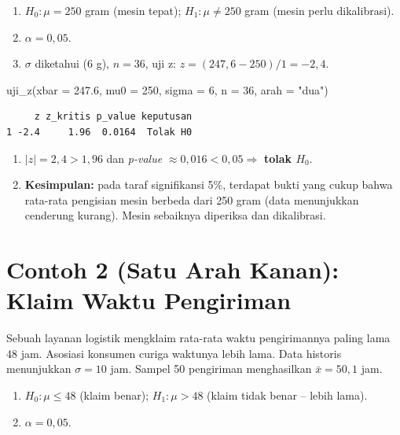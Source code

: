 \documentclass[
  indonesian,
  letterpaper,
]{book}
\newenvironment{Shaded}{\begin{snugshade}}{\end{snugshade}}
\newcommand{\AttributeTok}[1]{\textcolor[rgb]{0.40,0.45,0.13}{#1}}
\newcommand{\DecValTok}[1]{\textcolor[rgb]{0.68,0.00,0.00}{#1}}
\newcommand{\FloatTok}[1]{\textcolor[rgb]{0.68,0.00,0.00}{#1}}
\newcommand{\FunctionTok}[1]{\textcolor[rgb]{0.28,0.35,0.67}{#1}}
\newcommand{\NormalTok}[1]{\textcolor[rgb]{0.00,0.23,0.31}{#1}}
\newcommand{\StringTok}[1]{\textcolor[rgb]{0.13,0.47,0.30}{#1}}
\providecommand{\tightlist}{%
  \setlength{\itemsep}{0pt}\setlength{\parskip}{0pt}}
\begin{document}
\begin{enumerate}
\def\labelenumi{\arabic{enumi}.}
\tightlist
\item
  \(H_0: \mu = 250\) gram (mesin tepat); \(H_1: \mu \ne 250\) gram
  (mesin perlu dikalibrasi).
\item
  \(\alpha = 0{,}05\).
\item
  \(\sigma\) diketahui (6 g), \(n = 36\), uji z:
  \(z = (247{,}6 - 250)/1 = -2{,}4\).
\end{enumerate}

\begin{Shaded}
\begin{Highlighting}[]
\FunctionTok{uji\_z}\NormalTok{(}\AttributeTok{xbar =} \FloatTok{247.6}\NormalTok{, }\AttributeTok{mu0 =} \DecValTok{250}\NormalTok{, }\AttributeTok{sigma =} \DecValTok{6}\NormalTok{, }\AttributeTok{n =} \DecValTok{36}\NormalTok{, }\AttributeTok{arah =} \StringTok{"dua"}\NormalTok{)}
\end{Highlighting}
\end{Shaded}

\begin{verbatim}
     z z_kritis p_value keputusan
1 -2.4     1.96  0.0164  Tolak H0
\end{verbatim}

\begin{enumerate}
\def\labelenumi{\arabic{enumi}.}
\setcounter{enumi}{3}
\tightlist
\item
  \(\lvert z \rvert = 2{,}4 > 1{,}96\) dan \emph{p-value}
  \(\approx 0{,}016 < 0{,}05 \Rightarrow\) \textbf{tolak \(H_0\)}.
\item
  \textbf{Kesimpulan:} pada taraf signifikansi 5\%, terdapat bukti yang
  cukup bahwa rata-rata pengisian mesin berbeda dari 250 gram (data
  menunjukkan cenderung kurang). Mesin sebaiknya diperiksa dan
  dikalibrasi.
\end{enumerate}

\section{Contoh 2 (Satu Arah Kanan): Klaim Waktu
Pengiriman}\label{contoh-2-satu-arah-kanan-klaim-waktu-pengiriman}

Sebuah layanan logistik mengklaim rata-rata waktu pengirimannya paling
lama 48 jam. Asosiasi konsumen curiga waktunya lebih lama. Data historis
menunjukkan \(\sigma = 10\) jam. Sampel 50 pengiriman menghasilkan
\(\bar{x} = 50{,}1\) jam.

\begin{enumerate}
\def\labelenumi{\arabic{enumi}.}
\tightlist
\item
  \(H_0: \mu \le 48\) (klaim benar); \(H_1: \mu > 48\) (klaim tidak
  benar -- lebih lama).
\item
  \(\alpha = 0{,}05\).
\end{enumerate}
\end{document}

